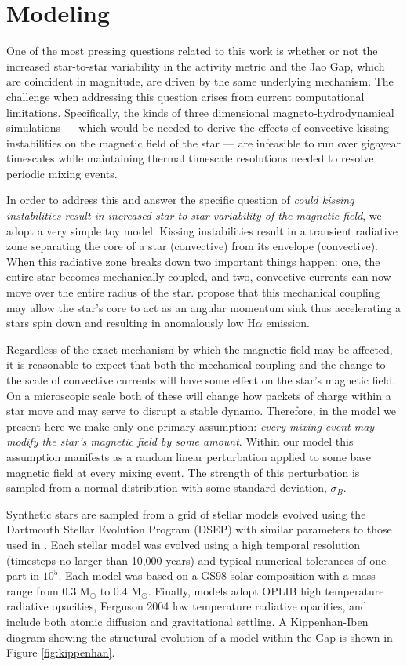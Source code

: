 \section{Modeling}\label{sec:modeling}
One of the most pressing questions related to this work is whether or not the
increased star-to-star variability in the activity metric and the Jao Gap,
which are coincident in magnitude, are driven by the same underlying mechanism.
The challenge when addressing this question arises from current computational
limitations. Specifically, the kinds of three dimensional
magneto-hydrodynamical simulations --- which would be needed to derive the
effects of convective kissing instabilities on the magnetic field of the star
--- are infeasible to run over gigayear timescales while maintaining thermal
timescale resolutions needed to resolve periodic mixing events.

In order to address this and answer the specific question of \textit{could
kissing instabilities result in increased star-to-star variability of the
magnetic field}, we adopt a very simple toy model. Kissing instabilities result
in a transient radiative zone separating the core of a star (convective) from its
envelope (convective). When this radiative zone breaks down two important
things happen: one, the entire star becomes mechanically coupled, and two,
convective currents can now move over the entire radius of the star.
\citet{Jao2023} propose that this mechanical coupling may allow the star's core
to act as an angular momentum sink thus accelerating a stars spin down and
resulting in anomalously low H$\alpha$ emission. 

Regardless of the exact mechanism by which the magnetic field may be affected,
it is reasonable to expect that both the mechanical coupling and the change to
the scale of convective currents will have some effect on the star's magnetic
field. On a microscopic scale both of these will change how packets of charge
within a star move and may serve to disrupt a stable dynamo. Therefore, in the
model we present here we make only one primary assumption: \textit{every mixing
event may modify the star's magnetic field by some amount}. Within our model
this assumption manifests as a random linear perturbation applied to some base
magnetic field at every mixing event. The strength of this perturbation is 
sampled from a normal distribution with some standard deviation, $\sigma_{B}$.

Synthetic stars are sampled from a grid of stellar models evolved using the
Dartmouth Stellar Evolution Program (DSEP) with similar parameters to those
used in \citet{Boudreaux2023}. Each stellar model was evolved using a high
temporal resolution (timesteps no larger than 10,000 years) and typical
numerical tolerances of one part in $10^5$. Each model was based on a GS98
\citep{Grevesse1998} solar composition with a mass range from 0.3 M$_{\odot}$
to 0.4 M$_{\odot}$. Finally, models adopt OPLIB high temperature radiative
opacities, Ferguson 2004 low temperature radiative opacities, and include both
atomic diffusion and gravitational settling. A Kippenhan-Iben diagram showing
the structural evolution of a model within the Gap is shown in Figure
\ref{fig:kippenhan}.

